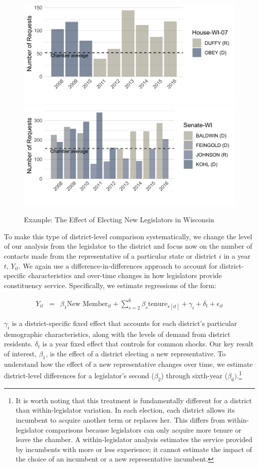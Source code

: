 \documentclass[12pt]{article}
\begin{document}
\begin{figure}[hb!]
\centering
\caption{Example: The Effect of Electing New Legislators in Wisconsin} \label{f:wi}
\includegraphics[width = .8\textwidth]{figs/districts/(WI-07)}
\includegraphics[width = .8\textwidth]{figs/districts/(WI)}
\end{figure}

To make this type of district-level comparison systematically, we change the level of our analysis from the legislator to the district and focus now on the number of contacts made from the representative of a particular state or district $i$ in a year $t$, $Y_{it}$. We again use a difference-in-differences approach to account for district-specific characteristics and over-time changes in how legislators provide constituency service. Specifically, we estimate regressions of the form: 


\begin{eqnarray}
Y_{it} & = & \beta_{1}\text{New Member}_{it} + \sum_{s = 2}^{6} \beta_{s} \text{tenure}_{s[it]} + \gamma_{i} + \delta_{t} + \epsilon_{it} \label{e:district1} 
\end{eqnarray}

$\gamma_{i}$ is a district-specific fixed effect that accounts for each district's particular demographic characteristics, along with the levels of demand from district residents. $\delta_{t}$ is a year fixed effect that controls for common shocks. Our key result of interest, $\beta_{1}$, is the effect of a district electing a new representative. To understand how the effect of a new representative changes over time, we estimate district-level differences for a legislator's second ($\beta_{2}$) through sixth-year ($\beta_{6})$.\footnote{It is worth noting that this treatment is fundamentally different for a district than within-legislator variation. In each election, each district allows its incumbent to acquire another term or replaces her. This differs from within-legislator comparisons because legislators can only acquire more tenure or leave the chamber. A within-legislator analysis estimates the service provided by incumbents with more or less experience; it cannot estimate the impact of the choice of an incumbent or a new representative incumbent.} %
\end{document}
